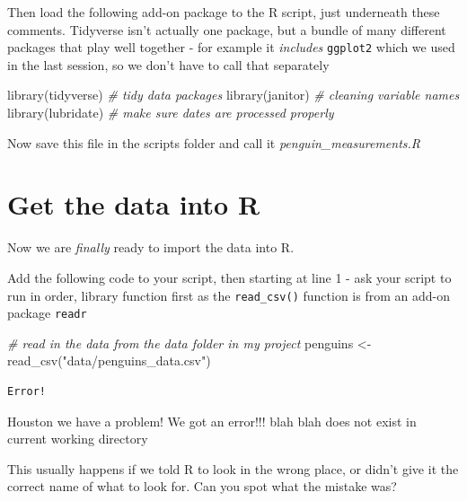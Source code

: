 \documentclass[
]{book}
\newenvironment{Shaded}{\begin{snugshade}}{\end{snugshade}}
\newcommand{\CommentTok}[1]{\textcolor[rgb]{0.56,0.35,0.01}{\textit{#1}}}
\newcommand{\FunctionTok}[1]{\textcolor[rgb]{0.00,0.00,0.00}{#1}}
\newcommand{\NormalTok}[1]{#1}
\newcommand{\OtherTok}[1]{\textcolor[rgb]{0.56,0.35,0.01}{#1}}
\newcommand{\StringTok}[1]{\textcolor[rgb]{0.31,0.60,0.02}{#1}}
\begin{document}
Then load the following add-on package to the R script, just underneath these comments. Tidyverse isn't actually one package, but a bundle of many different packages that play well together - for example it \emph{includes} \texttt{ggplot2} which we used in the last session, so we don't have to call that separately

\begin{Shaded}
\begin{Highlighting}[]
\FunctionTok{library}\NormalTok{(tidyverse) }\CommentTok{\# tidy data packages}
\FunctionTok{library}\NormalTok{(janitor) }\CommentTok{\# cleaning variable names}
\FunctionTok{library}\NormalTok{(lubridate) }\CommentTok{\# make sure dates are processed properly}
\end{Highlighting}
\end{Shaded}

Now save this file in the scripts folder and call it \emph{penguin\_measurements.R}

\hypertarget{get-the-data-into-r}{%
\section{Get the data into R}\label{get-the-data-into-r}}

Now we are \emph{finally} ready to import the data into R.

Add the following code to your script, then starting at line 1 - ask your script to run in order, library function first as the \texttt{read\_csv()} function is from an add-on package \texttt{readr}

\begin{Shaded}
\begin{Highlighting}[]
\CommentTok{\# read in the data from the data folder in my project}
\NormalTok{penguins }\OtherTok{\textless{}{-}} \FunctionTok{read\_csv}\NormalTok{(}\StringTok{"data/penguins\_data.csv"}\NormalTok{)}
\end{Highlighting}
\end{Shaded}

\begin{verbatim}
Error!
\end{verbatim}

Houston we have a problem! We got an error!!! blah blah does not exist in current working directory

This usually happens if we told R to look in the wrong place, or didn't give it the correct name of what to look for. Can you spot what the mistake was?
\end{document}

